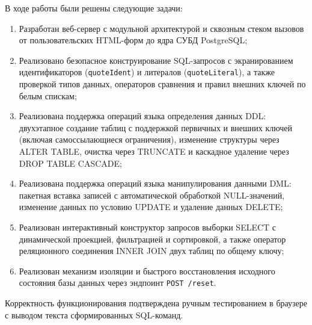 \Conclusion %
\label{cha:conclusion}

В ходе работы были решены следующие задачи:
\begin{enumerate}
    \item Разработан веб-сервер с модульной архитектурой и сквозным стеком вызовов от пользовательских HTML-форм до ядра СУБД PostgreSQL;
    \item Реализовано безопасное конструирование SQL-запросов с экранированием идентификаторов (\texttt{quoteIdent}) и литералов (\texttt{quoteLiteral}), а также проверкой типов данных, операторов сравнения и правил внешних ключей по белым спискам;
    \item Реализована поддержка операций языка определения данных DDL: двухэтапное создание таблиц с поддержкой первичных и внешних ключей (включая самоссылающиеся ограничения), изменение структуры через ALTER TABLE, очистка через TRUNCATE и каскадное удаление через DROP TABLE CASCADE;
    \item Реализована поддержка операций языка манипулирования данными DML: пакетная вставка записей с автоматической обработкой NULL-значений, изменение данных по условию UPDATE и удаление данных DELETE;
    \item Реализован интерактивный конструктор запросов выборки SELECT с динамической проекцией, фильтрацией и сортировкой, а также оператор реляционного соединения INNER JOIN двух таблиц по общему ключу;
    \item Реализован механизм изоляции и быстрого восстановления исходного состояния базы данных через эндпоинт \texttt{POST /reset}.
\end{enumerate}

Корректность функционирования подтверждена ручным тестированием в браузере с выводом текста сформированных SQL-команд.
